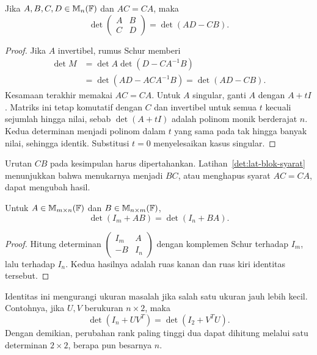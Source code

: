 \begin{thm}
      \label{det:blokkomutatif}
      Jika $A,B,C,D\in\mathbb{M}_n(\mathbb{F})$ dan $AC=CA$, maka
      \[
            \det\begin{pmatrix}A&B\\C&D\end{pmatrix}=\det(AD-CB).
      \]
\end{thm}
\begin{proof}
      Jika $A$ invertibel, rumus Schur memberi
      \begin{align*}
            \det M
             & =\det A\det(D-CA^{-1}B)          \\
             & =\det(AD-ACA^{-1}B)=\det(AD-CB).
      \end{align*}
      Kesamaan terakhir memakai $AC=CA$.
      Untuk $A$ singular, ganti $A$ dengan $A+tI$.
      Matriks ini tetap komutatif dengan $C$ dan invertibel untuk semua
      $t$ kecuali sejumlah hingga nilai, sebab $\det(A+tI)$ adalah
      polinom monik berderajat $n$.
      Kedua determinan menjadi polinom dalam $t$ yang sama pada tak hingga
      banyak nilai, sehingga identik. Substitusi $t=0$ menyelesaikan kasus singular.
\end{proof}

Urutan $CB$ pada kesimpulan harus dipertahankan.
Latihan~\ref{det:lat-blok-syarat} menunjukkan bahwa menukarnya menjadi
$BC$, atau menghapus syarat $AC=CA$, dapat mengubah hasil.

\begin{prop}
      Untuk $A\in\mathbb{M}_{m\times n}(\mathbb{F})$ dan $B\in\mathbb{M}_{n\times m}(\mathbb{F})$,
      \[
            \det(I_m+AB)=\det(I_n+BA).
      \]
\end{prop}
\begin{proof}
      Hitung determinan
      $\left(\begin{smallmatrix}I_m&A\\-B&I_n\end{smallmatrix}\right)$
      dengan komplemen Schur terhadap $I_m$, lalu terhadap $I_n$.
      Kedua hasilnya adalah ruas kanan dan ruas kiri identitas tersebut.
\end{proof}

Identitas ini mengurangi ukuran masalah jika salah satu ukuran jauh
lebih kecil. Contohnya, jika $U,V$ berukuran $n\times2$, maka
\[
      \det(I_n+UV^T)=\det(I_2+V^TU).
\]
Dengan demikian, perubahan rank paling tinggi dua dapat dihitung
melalui satu determinan $2\times2$, berapa pun besarnya $n$.

